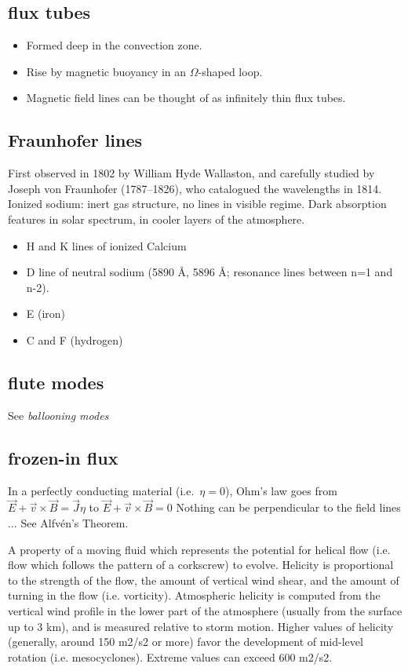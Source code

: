 \documentclass{article}
\begin{document}
\subsection{flux tubes}
    \begin{itemize}
        \item Formed deep in the convection zone.
        \item Rise by magnetic buoyancy in an $\Omega$-shaped loop.
        \item Magnetic field lines can be thought of as infinitely
          thin flux tubes.
    \end{itemize}
\subsection{Fraunhofer lines}
First observed in 1802 by William Hyde Wallaston, and carefully
studied by Joseph von Fraunhofer (1787--1826), who catalogued
the wavelengths in 1814. Ionized sodium: inert gas structure,
no lines in visible regime. Dark absorption features in solar
spectrum, in cooler layers of the atmosphere.
\begin{itemize}
    \item H and K lines of ionized Calcium
    \item D line of neutral sodium (5890 \AA{}, 5896 \AA{};
        resonance lines between n=1 and n-2).
    \item E (iron)
    \item C and F (hydrogen)
\end{itemize}
\subsection{flute modes}
See \emph{ballooning modes}
\subsection{frozen-in flux}
In a perfectly conducting material (i.e.\ $\eta = 0$),
Ohm's law goes from
$ \vec{E} + \vec{v} \times \vec{B} = \vec{J}\eta $ to
$ \vec{E} + \vec{v} \times \vec{B} = 0 $
Nothing can be perpendicular to the field lines $\ldots$
See Alfv\'en's Theorem.

A property of a moving fluid which represents the potential for helical flow
(i.e. flow which follows the pattern of a corkscrew) to evolve. Helicity is
proportional to the strength of the flow, the amount of vertical wind shear,
and the amount of turning in the flow (i.e. vorticity). Atmospheric helicity is
computed from the vertical wind profile in the lower part of the atmosphere
(usually from the surface up to 3 km), and is measured relative to storm
motion. Higher values of helicity (generally, around 150 m2/s2 or more) favor
the development of mid-level rotation (i.e. mesocyclones). Extreme values can
exceed 600 m2/s2.
\end{document}
